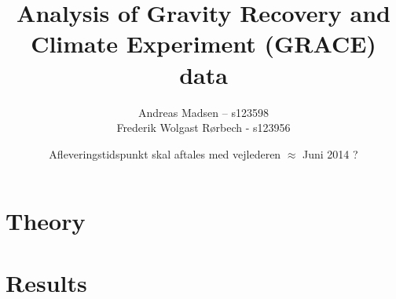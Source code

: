 \documentclass[a4paper]{article}
\numberwithin{equation}{section}
\numberwithin{figure}{section}
\numberwithin{table}{section}
\begin{document}
\title{Analysis of Gravity Recovery and Climate Experiment (GRACE) data}
\author{Andreas Madsen – s123598\\Frederik Wolgast Rørbech - s123956}
\date{Afleveringstidspunkt skal aftales med vejlederen $\approx$ Juni 2014 ?}
\maketitle

\setcounter{tocdepth}{2}
\pagebreak
\tableofcontents
\pagebreak





\pagebreak
\section{Theory}







\pagebreak
\section{Results}





\pagebreak


\pagebreak
\printbibliography
\end{document}
